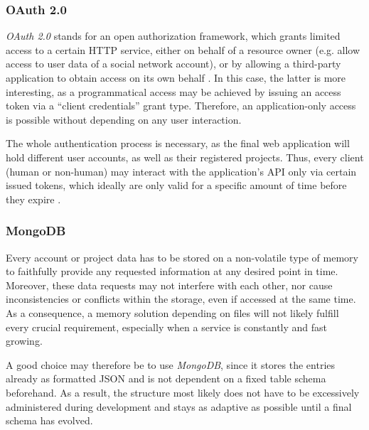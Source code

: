 

\subsubsection{OAuth 2.0}
\emph{OAuth 2.0} stands for an open authorization framework, which grants limited access to a certain HTTP service, either on behalf of a resource owner (e.g. allow access to user data of a social network account), or by allowing a third-party application to obtain access on its own behalf \cite[1]{hardt2012oauth}. In this case, the latter is more interesting, as a programmatical access may be achieved by issuing an access token via a ``client credentials'' grant type. Therefore, an application-only access is possible without depending on any user interaction.

The whole authentication process is necessary, as the final web application will hold different user accounts, as well as their registered projects. Thus, every client (human or non-human) may interact with the application's API only via certain issued tokens, which ideally are only valid for a specific amount of time before they expire \cite[43]{hardt2012oauth}.

\subsubsection{MongoDB}
Every account or project data has to be stored on a non-volatile type of memory to faithfully provide any requested information at any desired point in time. Moreover, these data requests may not interfere with each other, nor cause inconsistencies or conflicts within the storage, even if accessed at the same time. As a consequence, a memory solution depending on files will not likely fulfill every crucial requirement, especially when a service is constantly and fast growing.

A good choice may therefore be to use \emph{MongoDB}, since it stores the entries already as formatted JSON and is not dependent on a fixed table schema beforehand. As a result, the structure most likely does not have to be excessively administered during development and stays as adaptive as possible until a final schema has evolved.

